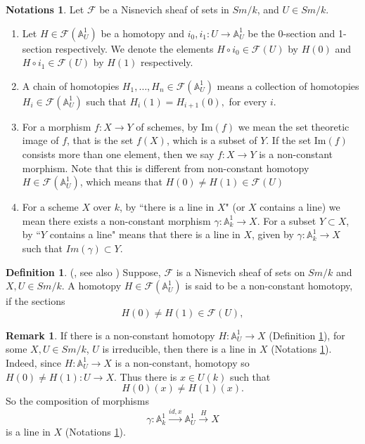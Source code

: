 \documentclass[11pt, reqno]{amsart}
\theoremstyle{plain}
\theoremstyle{definition}
\newtheorem{remark}[thm]{Remark}
\newtheorem{notation}[thm]{Notations}
\newtheorem{definition}[thm]{Definition}
\newcommand{\sF}{{\mathcal F}}
\newcommand{\A}{{\mathbb A}}
\begin{document}
\begin{notation}\label{notations} \cite[Notations 2.8]{choudhury2} Let $\sF$ be a Nisnevich sheaf of sets in $Sm/k$, and $U\in Sm/k$.
\begin{enumerate}
\item Let $H \in \sF(\A^1_U)$ be a homotopy and $i_0,i_1: U \to \A^1_U$ be the 0-section and 1-section respectively. We denote the elements $H\circ i_0 \in \sF(U)$ by $H(0)$ and $H\circ i_1 \in \sF(U)$ by $H(1)$
respectively.
\item A chain of homotopies $H_1,\dots,H_n \in \sF(\A^1_U)$ means a collection of homotopies $H_i\in\sF(\A^1_U)$ such that $H_i(1)=H_{i+1}(0),$ for every $i$.
\item For a morphism $f: X \to Y$ of schemes, by $\text{Im}(f)$ we mean the set theoretic image of $f$, that is the set $f(X)$, which is a subset of $Y$. If the set $\text{Im}(f)$ consists more than one element, then we say $f: X \to Y$ is a non-constant morphism. Note that this is different from non-constant homotopy $H \in \sF(\A^1_U)$, which means that $H(0) \neq H(1) \in \sF(U)$
\item For a scheme $X$ over $k$, by ``there is a line in $X$" (or $X$ contains a line) we mean there exists a non-constant morphism $\gamma: \A^1_k \to X$. For a subset $Y \subset X$, by ``$Y$ contains a line" means that there is a line in $X$, given by $\gamma: \A^1_k \to X$ such that $Im(\gamma) \subset Y$.

\end{enumerate}
\end{notation}
\begin{definition}\label{non-constant-homotopy-defn} (\cite[Definition 2.4]{choudhury2}, see also \cite[Example 2.5]{choudhury2})
	Suppose, 
	$\sF$ is a Nisnevich sheaf of sets on $Sm/k$ and 
	$X, U \in Sm/k$. A homotopy $H \in \sF(\A^1_U)$ is said to be a non-constant homotopy, if the sections
	$$H (0) \neq H (1) \in \sF(U),$$
	
\end{definition}
\begin{remark} \label{line remark}
If there is a non-constant homotopy $H: \A^1_U \to X$ (Definition \ref{non-constant-homotopy-defn}), for some $X, U \in Sm/k$, $U$ is irreducible, then there is a line in $X$ (Notations \ref{notations}). Indeed, since $H: \A^1_U \to X$ is a non-constant, homotopy so $H(0) \neq H(1): U \to X$. Thus there is $x \in U(k)$ such that 
$$H(0)(x) \neq H(1)(x).$$
So the composition of morphisms
$$\gamma: \A^1_k \xrightarrow{id, x} \A^1_U \xrightarrow{H} X$$
is a line in $X$ (Notations \ref{notations}).
\end{remark}
\end{document}

